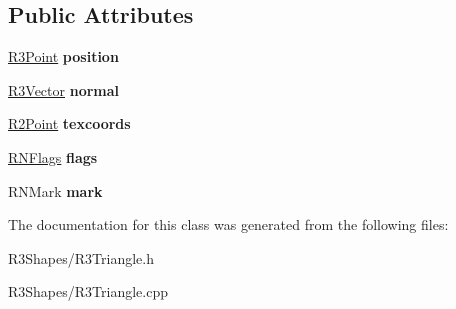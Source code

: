 \subsection*{Public Attributes}
\begin{DoxyCompactItemize}
\item 
\hyperlink{class_r3_point}{R3\+Point} {\bfseries position}\hypertarget{class_r3_triangle_vertex_a5ef66adc682cf3b9d9bc3b11bd4c9bdc}{}\label{class_r3_triangle_vertex_a5ef66adc682cf3b9d9bc3b11bd4c9bdc}

\item 
\hyperlink{class_r3_vector}{R3\+Vector} {\bfseries normal}\hypertarget{class_r3_triangle_vertex_aa78e0905aaf0f35141dc88936b92f76c}{}\label{class_r3_triangle_vertex_aa78e0905aaf0f35141dc88936b92f76c}

\item 
\hyperlink{class_r2_point}{R2\+Point} {\bfseries texcoords}\hypertarget{class_r3_triangle_vertex_ae96f42a620e248b317345e7b257f6523}{}\label{class_r3_triangle_vertex_ae96f42a620e248b317345e7b257f6523}

\item 
\hyperlink{class_r_n_flags}{R\+N\+Flags} {\bfseries flags}\hypertarget{class_r3_triangle_vertex_a492beec991ee3585646b60f26ce461b1}{}\label{class_r3_triangle_vertex_a492beec991ee3585646b60f26ce461b1}

\item 
R\+N\+Mark {\bfseries mark}\hypertarget{class_r3_triangle_vertex_a517c459a4cbea0aebba75dd346f33879}{}\label{class_r3_triangle_vertex_a517c459a4cbea0aebba75dd346f33879}

\end{DoxyCompactItemize}


The documentation for this class was generated from the following files\+:\begin{DoxyCompactItemize}
\item 
R3\+Shapes/R3\+Triangle.\+h\item 
R3\+Shapes/R3\+Triangle.\+cpp\end{DoxyCompactItemize}
